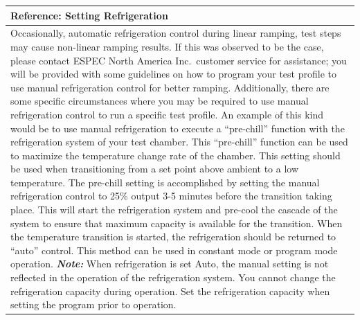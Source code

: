 \begin{longtable}[]{@{}l@{}}
\toprule
\begin{minipage}[b]{0.97\columnwidth}\raggedright
\textbf{Reference}: Setting Refrigeration\strut
\end{minipage}\tabularnewline
\midrule
\endhead
\begin{minipage}[t]{0.97\columnwidth}\raggedright
Occasionally, automatic refrigeration control during linear ramping,
test steps may cause non-linear ramping results. If this was observed to
be the case, please contact ESPEC North America Inc.~customer service
for assistance; you will be provided with some guidelines on how to
program your test profile to use manual refrigeration control for better
ramping. Additionally, there are some specific circumstances where you
may be required to use manual refrigeration control to run a specific
test profile. An example of this kind would be to use manual
refrigeration to execute a ``pre-chill'' function with the refrigeration
system of your test chamber. This ``pre-chill'' function can be used to
maximize the temperature change rate of the chamber. This setting should
be used when transitioning from a set point above ambient to a low
temperature. The pre-chill setting is accomplished by setting the manual
refrigeration control to 25\% output 3-5 minutes before the transition
taking place. This will start the refrigeration system and pre-cool the
cascade of the system to ensure that maximum capacity is available for
the transition. When the temperature transition is started, the
refrigeration should be returned to ``auto'' control. This method can be
used in constant mode or program mode operation. \textbf{\emph{Note:}}
When refrigeration is set Auto, the manual setting is not reflected in
the operation of the refrigeration system. You cannot change the
refrigeration capacity during operation. Set the refrigeration capacity
when setting the program prior to operation.\strut
\end{minipage}\tabularnewline
\bottomrule
\end{longtable}

